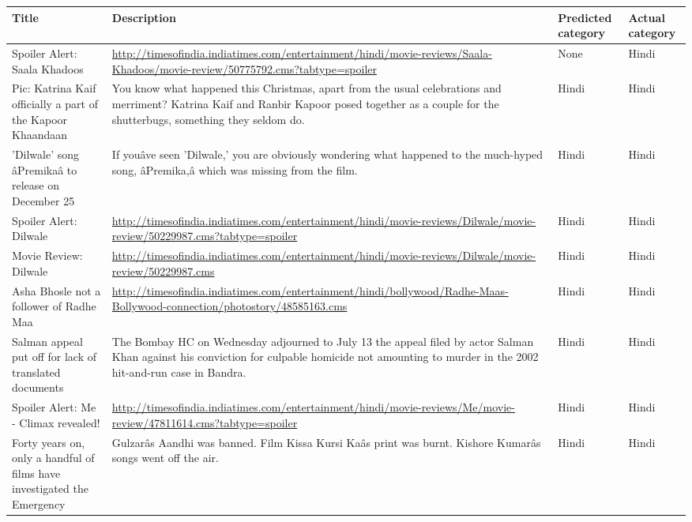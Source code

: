 \begin{itemize}
\begin{table}
\caption{Output with `Title' , `Description', `Predicted category' and `Actual category' }
\label{table1}
\begin{center}
\begin{longtable}{|p{3cm}|p{7cm}|p{1.5cm}|p{1.5cm}|}
\hline
\textbf{Title} & \textbf{Description} & \textbf{Predicted category} & \textbf{Actual category} \\ \hline
  Spoiler Alert: Saala Khadoos&  \url{http://timesofindia.indiatimes.com/entertainment/hindi/movie-reviews/Saala-Khadoos/movie-review/50775792.cms?tabtype=spoiler}&   None&   Hindi    \\ \hline
  Pic: Katrina Kaif officially a part of the Kapoor Khaandaan&  You know what happened this Christmas, apart from the usual celebrations and merriment? Katrina Kaif and Ranbir Kapoor posed together as a couple for the shutterbugs, something they seldom do.&   Hindi&   Hindi\\ \hline
  'Dilwale' song âPremikaâ to release on December 25&  If youâve seen 'Dilwale,' you are obviously wondering what happened to the much-hyped song, âPremika,â which was missing from the film.&   Hindi&   Hindi\\ \hline
  Spoiler Alert: Dilwale&  \url{http://timesofindia.indiatimes.com/entertainment/hindi/movie-reviews/Dilwale/movie-review/50229987.cms?tabtype=spoiler}&   Hindi&   Hindi\\ \hline
  Movie Review: Dilwale&  \url{http://timesofindia.indiatimes.com/entertainment/hindi/movie-reviews/Dilwale/movie-review/50229987.cms} &   Hindi&   Hindi\\ \hline
  Asha Bhosle not a follower of Radhe Maa&  \url{http://timesofindia.indiatimes.com/entertainment/hindi/bollywood/Radhe-Maas-Bollywood-connection/photostory/48585163.cms} &   Hindi&   Hindi\\ \hline
  Salman appeal put off for lack of translated documents&  The Bombay HC on Wednesday adjourned to July 13 the appeal filed by actor Salman Khan against his conviction for culpable homicide not amounting to murder in the 2002 hit-and-run case in Bandra.&   Hindi&   Hindi\\ \hline
  Spoiler Alert: Me - Climax revealed!& \url{ http://timesofindia.indiatimes.com/entertainment/hindi/movie-reviews/Me/movie-review/47811614.cms?tabtype=spoiler} &   Hindi&   Hindi\\ \hline
  Forty years on, only a handful of films have investigated the Emergency&  Gulzarâs Aandhi was banned. Film Kissa Kursi Kaâs print was burnt. Kishore Kumarâs songs went off the air.&   Hindi&   Hindi\\ \hline

\end{longtable}
\end{center}
\end{table}
\end{itemize}
